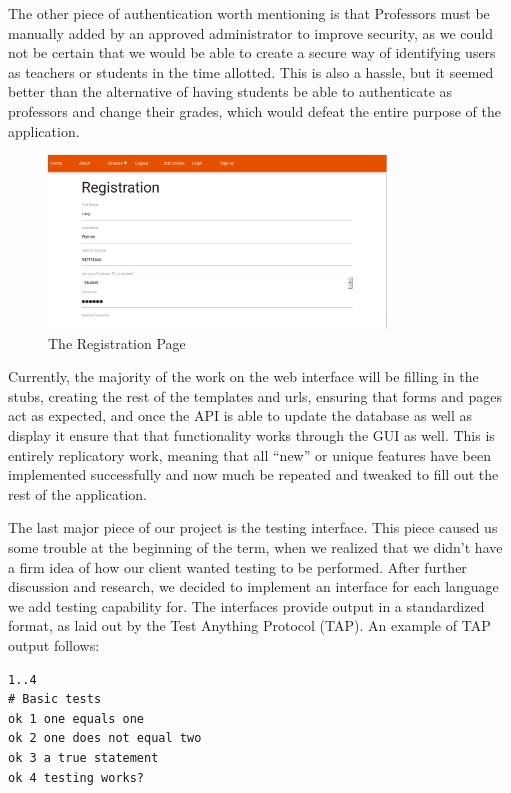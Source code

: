 \documentclass[10pt,draftclsnofoot,onecolumn]{IEEEtran}
\begin{document}
The other piece of authentication worth mentioning is that Professors must be
manually added by an approved administrator to improve security, as we could
not be certain that we would be able to create a secure way of identifying
users as teachers or students in the time allotted. This is also a hassle, but
it seemed better than the alternative of having students be able to
authenticate as professors and change their grades, which would defeat the
entire purpose of the application.


\begin{figure}[h]
\centering
\includegraphics[width=0.8\textwidth]{register}
\caption{The Registration Page}
\end{figure}

Currently, the majority of the work on the web interface will be filling in the
stubs, creating the rest of the templates and urls, ensuring that forms and
pages act as expected, and once the API is able to update the database as well
as display it ensure that that functionality works through the GUI as well.
This is entirely replicatory work, meaning that all “new” or unique features
have been implemented successfully and now much be repeated and tweaked to fill
out the rest of the application.  

The last major piece of our project is the testing interface. This piece caused
us some trouble at the beginning of the term, when we realized that we didn’t
have a firm idea of how our client wanted testing to be performed. After
further discussion and research, we decided to implement an interface for each
language we add testing capability for. The interfaces provide output in a
standardized format, as laid out by the Test Anything Protocol (TAP). An
example of TAP output follows:

\begin{lstlisting}
1..4
# Basic tests
ok 1 one equals one 
ok 2 one does not equal two 
ok 3 a true statement 
ok 4 testing works?
\end{lstlisting}
\end{document}
